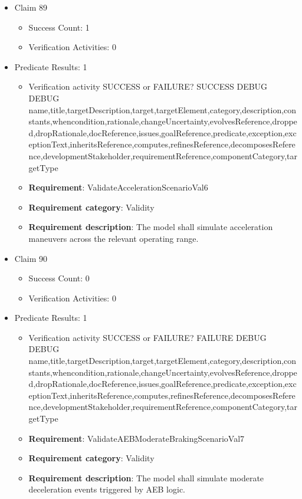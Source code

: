 \documentclass{article}
\begin{document}
\begin{itemize}
  				  \item Claim 89
				\begin{itemize}
			    	\item Success Count: 1 
			    	\item Verification Activities: 0
				\end{itemize}
				
									    
				\item Predicate Results: 1
					\begin{itemize}				
					\item Verification activity SUCCESS or FAILURE? SUCCESS
					DEBUG DEBUG name,title,targetDescription,target,targetElement,category,description,constants,whencondition,rationale,changeUncertainty,evolvesReference,dropped,dropRationale,docReference,issues,goalReference,predicate,exception,exceptionText,inheritsReference,computes,refinesReference,decomposesReference,developmentStakeholder,requirementReference,componentCategory,targetType
					\item \textbf{Requirement}: ValidateAccelerationScenarioVal6 
					\item \textbf{Requirement category}: Validity
					\item \textbf{Requirement description}: The model shall simulate acceleration maneuvers across the relevant operating range.
					\end{itemize}

  				  \item Claim 90
				\begin{itemize}
			    	\item Success Count: 0 
			    	\item Verification Activities: 0
				\end{itemize}
				
									    
				\item Predicate Results: 1
					\begin{itemize}				
					\item Verification activity SUCCESS or FAILURE? FAILURE
					DEBUG DEBUG name,title,targetDescription,target,targetElement,category,description,constants,whencondition,rationale,changeUncertainty,evolvesReference,dropped,dropRationale,docReference,issues,goalReference,predicate,exception,exceptionText,inheritsReference,computes,refinesReference,decomposesReference,developmentStakeholder,requirementReference,componentCategory,targetType
					\item \textbf{Requirement}: ValidateAEBModerateBrakingScenarioVal7 
					\item \textbf{Requirement category}: Validity
					\item \textbf{Requirement description}: The model shall simulate moderate deceleration events triggered by AEB logic.
					\end{itemize}


\end{itemize}
\end{document}
